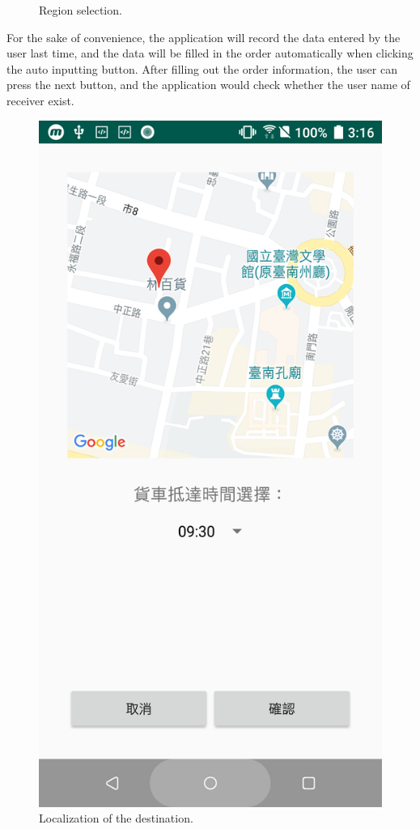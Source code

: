 \documentclass[12pt]{ksthesis}
\begin{document}
\begin{thesis}
{\begin{figure}[H]
\caption{Region selection.}
\label{Region_selection}
\end{figure}


For the sake of convenience, the application will record the data entered by the user last time, and the data will be filled in the order automatically when clicking the auto inputting button. After filling out the order information, the user can press the next button, and the application would check whether the user name of receiver exist.

\begin{figure}[H]
\centering
\includegraphics[scale=0.125]{./figures/F4-5-Localization.PNG}
\caption{\large Localization of the destination.}
\vspace{0.5cm}
\label{Fig:localization_of_destination}
\end{figure} 

}
\end{thesis}
\end{document}
